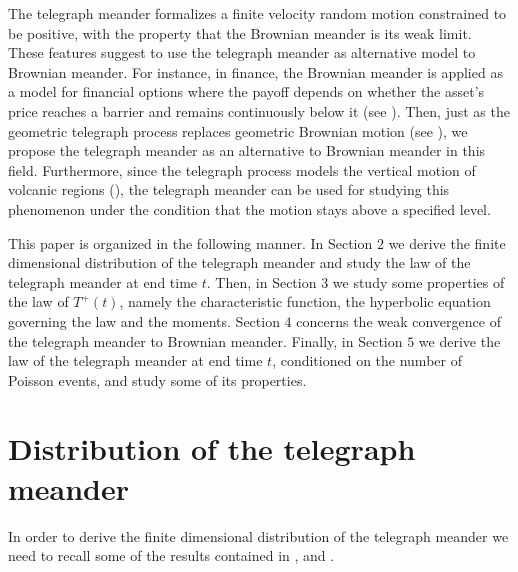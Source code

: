\documentclass{article}
\theoremstyle{definition}
\numberwithin{equation}{section}
\begin{document}
The telegraph meander formalizes a finite velocity random motion constrained to be positive, with the property that the Brownian meander is its weak limit. These features suggest to use the telegraph meander as alternative model to Brownian meander. For instance, in finance, the Brownian meander is applied as a model for financial options where the payoff depends on whether the asset’s price reaches a barrier and remains continuously below it (see \cite{CJ 1997}). Then, just as the geometric telegraph process replaces geometric Brownian motion (see \cite{DcP 2002}), we propose the telegraph meander as an alternative to Brownian meander in this field. Furthermore, since the telegraph process models the vertical motion of volcanic regions (\cite{TDc 2018}), the telegraph meander can be used for studying this phenomenon under the condition that the motion stays above a specified level.

This paper is organized in the following manner. In Section $2$ we derive the finite dimensional distribution of the telegraph meander and study the law of the telegraph meander at end time $t$. Then, in Section $3$ we study some properties of the law of $T^+(t)$, namely the characteristic function, the hyperbolic equation governing the law and the moments. Section $4$ concerns the weak convergence of the telegraph meander to Brownian meander. Finally, in Section $5$ we derive the law of the telegraph meander at end time $t$, conditioned on the number of Poisson events, and study some of its properties. 
\section{Distribution of the telegraph meander}
In order to derive the finite dimensional distribution of the telegraph meander we need to recall some of the results contained in \cite{CO 2021}, \cite{C 2023} and \cite{C 2020}. 
\end{document}
